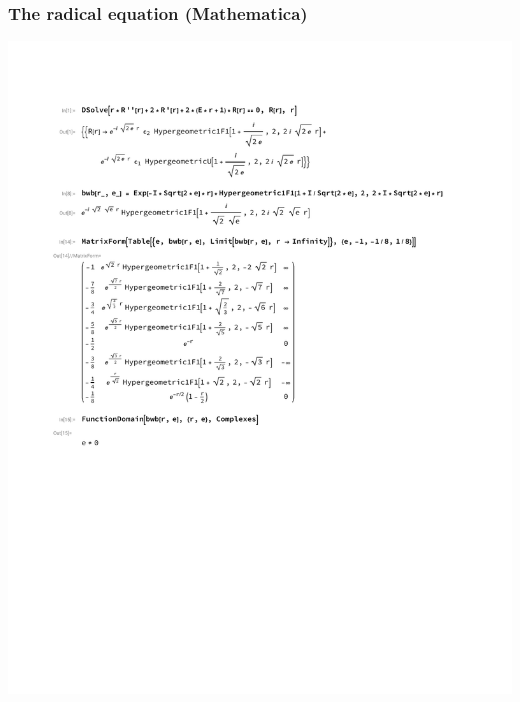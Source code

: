 \documentclass{beamer}
\begin{document}
\begin{frame}
\frametitle{The radical equation (Mathematica)}
\includegraphics[page=2, clip, trim=0in 0in 0in 1in, width=\textwidth]{classical hydrogen.pdf}
\end{frame}

\end{document}

